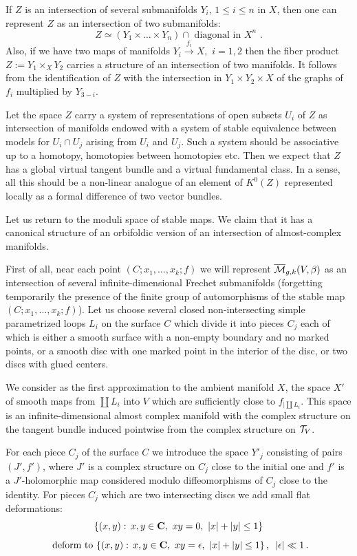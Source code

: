 \documentclass{amsart}
\begin{document}
If $Z$ is an intersection of several submanifolds $Y_i,\,1\le i\le n$ in $X$,
then one can represent $Z$ as an intersection of two submanifolds:
 $$Z\simeq (Y_1\times \dots \times Y_n)\cap \text{ diagonal in }X^n\,\,.$$
Also, if we have two maps of manifolds
 $Y_i \xrightarrow{f_i} X,\,\,i=1,2$ then the fiber product $Z:=Y_1\times_X Y_2$ carries a
structure of an intersection of two manifolds. It follows from the
identification of $Z$ with the intersection in $Y_1\times Y_2\times X$ of the
graphs of $f_i$ multiplied by $Y_{3-i}$.

Let the space $Z$ carry a system of representations of open subsets
 $U_i$ of $Z$ as intersection of  manifolds endowed with a system of stable
equivalence between models for $U_i\cap U_j$ arising from $U_i$ and $U_j$. Such
a system should be associative up to a homotopy, homotopies between homotopies
etc. Then we expect that $Z$  has a global virtual tangent bundle and a virtual
fundamental class.
 In a sense, all this should be a non-linear analogue of an element of $K^0(Z)$
represented locally as a formal difference of two vector bundles.

Let us return to the moduli space of stable maps.
We claim that it has  a canonical structure of an orbifoldic version  of an
intersection of almost-complex manifolds.

First of all, near each
 point $(C;x_1,\dots,x_k;f)$ we will represent $\overline{\mathcal{M}}_{g,k}(V,\beta)$ as an
intersection of several infinite-dimensional Frechet submanifolds (forgetting
temporarily the presence of the finite group of automorphisms of the stable map
$(C;x_1,\dots,x_k;f)$). Let us choose several closed non-intersecting simple
parametrized loops $L_i$ on the surface $C$ which divide it into pieces $C_j$
each of which is either a smooth surface with a non-empty boundary and no
marked points, or a smooth disc with one marked point in the interior of the
disc, or  two discs with glued centers.

We consider as the first approximation to the ambient manifold $X$,  the space
$X'$ of smooth maps  from $\coprod L_i$ into $V$ which are sufficiently close
to $f_{|\coprod L_i}$. This space is an infinite-dimensional almost complex
manifold with the complex structure on the tangent bundle induced pointwise
from the complex structure on $\mathcal T_V$.

For each piece $C_j$ of the surface $C$ we introduce the space $Y'_j$
 consisting of pairs $(J',f')$, where $J'$ is a complex structure on  $C_j$
close to the initial one and $f'$ is a $J'$-holomorphic map  considered modulo
diffeomorphisms of $C_j$ close to the identity.
  For pieces $C_j$ which are two intersecting discs we add  small flat
deformations:
$$\{(x,y):\,x,y\in \mathbf C,\,\,xy=0,\,\,|x|+|y|\le 1\}$$
$$\text{ deform to }
  \{(x,y):\,x,y\in \mathbf C,\,\,xy=\epsilon,\,\,|x|+|y|\le 1\}\,,\,\,\,|\epsilon|\ll 1\,.$$
\end{document}
